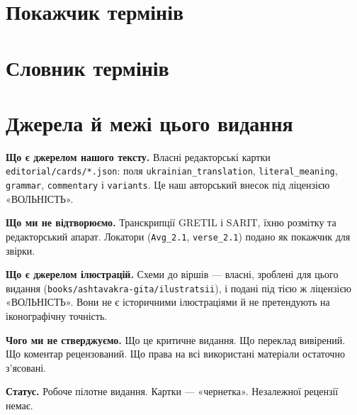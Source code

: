 \documentclass[10pt,a5paper,openany]{book}
\begin{document}
\chapter*{Покажчик термінів}
\printindex

\chapter*{Словник термінів}

\vspace{0.8em}


\chapter*{Джерела й межі цього видання}

\noindent\textbf{\sffamily Що є джерелом нашого тексту.}
Власні редакторські картки \texttt{editorial/}\allowbreak\texttt{cards/*.json}: поля
\texttt{ukrainian\_translation}, \texttt{literal\_meaning}, \texttt{grammar},
\texttt{commentary} і \texttt{variants}. Це наш авторський внесок під
ліцензією «ВОЛЬНІСТЬ».

\vspace{0.6em}
\noindent\textbf{\sffamily Що ми не відтворюємо.}
Транскрипції GRETIL і SARIT, їхню розмітку та редакторський апарат. Локатори
(\texttt{Avg\_2.1}, \texttt{verse\_2.1}) подано як покажчик для звірки.

\vspace{0.6em}
\noindent\textbf{\sffamily Що є джерелом ілюстрацій.}
Схеми до віршів — власні, зроблені для цього видання (\texttt{books/ashtavakra-gita/ilustratsii}),
і подані під тією ж ліцензією «ВОЛЬНІСТЬ». Вони не є історичними
ілюстраціями й не претендують на іконографічну точність.

\vspace{0.6em}
\noindent\textbf{\sffamily Чого ми не стверджуємо.}
Що це критичне видання. Що переклад вивірений. Що коментар рецензований. Що
права на всі використані матеріали остаточно з'ясовані.

\vspace{0.6em}
\noindent\textbf{\sffamily Статус.}
Робоче пілотне видання. Картки — «чернетка». Незалежної рецензії немає.
\end{document}
